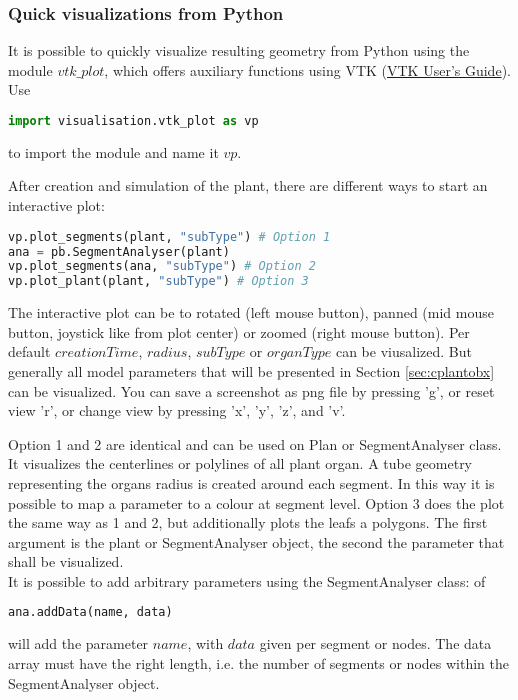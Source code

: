 
\subsubsection*{Quick visualizations from Python}

It is possible to quickly visualize resulting geometry from Python using the module $vtk\_plot$, which offers auxiliary functions using VTK (\href{https://vtk.org/vtk-users-guide/}{VTK User's Guide}). Use 
\begin{lstlisting}[language=Python]
import visualisation.vtk_plot as vp
\end{lstlisting}
to import the module and name it $vp$.

After creation and simulation of the plant, there are different ways to start an interactive plot:
\begin{lstlisting}[language=Python]
vp.plot_segments(plant, "subType") # Option 1
ana = pb.SegmentAnalyser(plant)
vp.plot_segments(ana, "subType") # Option 2
vp.plot_plant(plant, "subType") # Option 3
\end{lstlisting}
The interactive plot can be to rotated (left mouse button), panned (mid mouse button, joystick like from plot center) or zoomed (right mouse button). Per default $creationTime$, $radius$, $subType$ or $organType$ can be viusalized. But generally all model parameters that will be presented in Section \ref{sec:cplantobx} can be visualized. You can save a screenshot as png file by pressing 'g', or reset view 'r', or change view by pressing 'x', 'y', 'z', and 'v'.

Option 1 and 2 are identical and can be used on Plan or SegmentAnalyser class. It visualizes the centerlines or polylines of all plant organ. A tube geometry representing the organs radius is created around each segment. In this way it is possible to map a parameter to a colour at segment level.  Option 3 does the plot the same way as 1 and 2, but additionally plots the leafs a polygons. The first argument is the plant or SegmentAnalyser object, the second the parameter that shall be visualized. \\

It is possible to add arbitrary parameters using the SegmentAnalyser class: of 
\begin{lstlisting}[language=Python]
ana.addData(name, data) 
\end{lstlisting}
will add the parameter $name$, with $data$ given per segment or nodes. The data array must have the right length, i.e. the number of segments or nodes within the SegmentAnalyser object.

